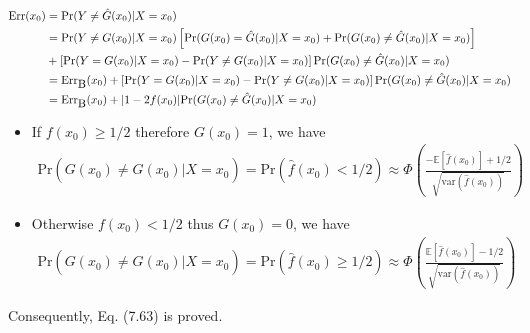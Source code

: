 \begin{exercise}
  \begin{align}
    \mbox{Err}(x_0) &= \mbox{Pr}(Y\not= \hat{G}(x_0)|X=x_0) \notag\\
    &= \mbox{Pr}(Y\not= G(x_0)|X=x_0)\left[
    \mbox{Pr}(G(x_0)=\hat{G}(x_0)|X=x_0) +
    \mbox{Pr}(G(x_0)\not=\hat{G}(x_0)|X=x_0)\right] \notag\\
    &+ \left[\mbox{Pr}(Y=G(x_0)|X=x_0) - \mbox{Pr}(Y\not=G(x_0)|X=x_0)\right]
    \mbox{Pr}(G(x_0)\not=\hat{G}(x_0)|X=x_0) \notag\\
    &= \mbox{Err}_{\mbox{B}}(x_0) + \left[\mbox{Pr}(Y=G(x_0)|X=x_0) -
    \mbox{Pr}(Y\not=G(x_0)|X=x_0)\right]\mbox{Pr}(G(x_0)\not=\hat{G}(x_0)|X=x_0)
    \notag\\
    &= \mbox{Err}_{\mbox{B}}(x_0)  +
    |1-2f(x_0)|\mbox{Pr}(G(x_0)\not=\hat{G}(x_0)|X=x_0)
  \end{align}
  
  \begin{itemize}
    \item If $f(x_0)\geq 1/2$ therefore $G(x_0)=1$, we have
    \begin{align}
      \mbox{Pr}(G(x_0)\not=\hat{G}(x_0)|X=x_0) =
      \mbox{Pr}(\hat{f}(x_0)<1/2) \approx
      \Phi\left(\frac{-\mathbb{E}\left[\hat{f}(x_0)\right]+1/2 }
      {\sqrt{\mbox{var}(\hat{f}(x_0))}}\right)
    \end{align}
    \item Otherwise $f(x_0)< 1/2$ thus $G(x_0)=0$, we have
    \begin{align}
      \mbox{Pr}(G(x_0)\not=\hat{G}(x_0)|X=x_0) =
      \mbox{Pr}(\hat{f}(x_0)\geq1/2) \approx
      \Phi\left(\frac{\mathbb{E}\left[\hat{f}(x_0)\right]-1/2}
      {\sqrt{\mbox{var}(\hat{f}(x_0))}}\right)
    \end{align}
  \end{itemize}
  Consequently, Eq. (7.63) is proved.
\end{exercise}

